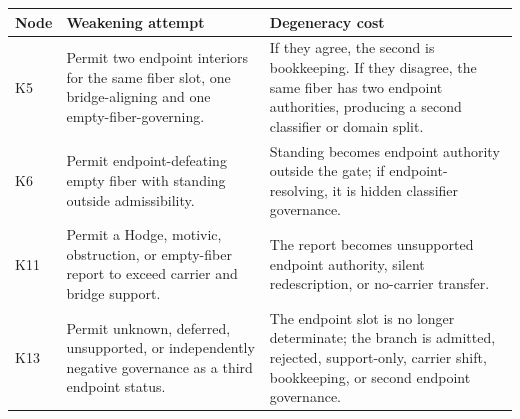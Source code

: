 \documentclass[11pt]{article}
\begin{document}
{\small
\begin{longtable}{p{}p{}p{}}
\toprule
Node & Weakening attempt & Degeneracy cost\\
\midrule
\endhead
K5 & Permit two endpoint interiors for the same fiber slot, one bridge-aligning and one empty-fiber-governing. & If they agree, the second is bookkeeping.  If they disagree, the same fiber has two endpoint authorities, producing a second classifier or domain split.\\
K6 & Permit endpoint-defeating empty fiber with standing outside admissibility. & Standing becomes endpoint authority outside the gate; if endpoint-resolving, it is hidden classifier governance.\\
K11 & Permit a Hodge, motivic, obstruction, or empty-fiber report to exceed carrier and bridge support. & The report becomes unsupported endpoint authority, silent redescription, or no-carrier transfer.\\
K13 & Permit unknown, deferred, unsupported, or independently negative governance as a third endpoint status. & The endpoint slot is no longer determinate; the branch is admitted, rejected, support-only, carrier shift, bookkeeping, or second endpoint governance.\\
\bottomrule
\end{longtable}
}
\end{document}
